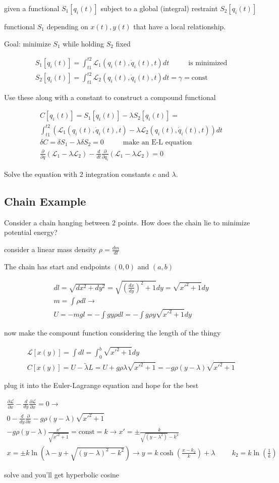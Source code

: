 \documentclass[fleqn]{report}
\newcommand{\hp}{\hspace{1cm}}
\newcommand{\const}{\textrm{const}}
\newcommand{\del}{\partial}
\newcommand{\equations} [1] {
\begin{gather*}
#1
\end{gather*}
}
\begin{document}
given a functional $S_1[q_i(t)]$ subject to a global (integral) restraint 
$S_2[q_i(t)]$

functional $S_1$ depending on $x(t), y(t)$ that have a local relationship. 

Goal: minimize $S_1$ while holding $S_2$ fixed 

\equations{
    S_1[q_i(t)] = 
    \int^{t2}_{t1} \mathcal L_1(q_i(t), \dot q_i(t), t) dt 
    \hp \textrm{ is minimized}
    \\
    S_2[q_i(t)] = 
    \int^{t2}_{t1} \mathcal L_2(q_i(t), \dot q_i(t), t) dt 
    =
    \gamma = \const 
}
Use these along with a constant to construct a compound functional 
\equations{
    C[q_i(t)] = S_1[q_i(t)] - \lambda S_2[q_i(t)]
    =
    \\
    \int^{t2}_{t1} (\mathcal L_1(q_i(t), \dot q_i(t), t) - 
    \lambda \mathcal L_2(q_i(t), \dot q_i(t), t)) dt 
    \\
    \delta C = \delta S_1 - \lambda \delta S_2 = 0
    \hp 
    \textrm{ make an E-L equation}
    \\
    \frac{\del}{\del q} (\mathcal L_1 - \lambda \mathcal L_2)
    -
    \frac{d}{dt} \frac{\del}{\del \dot q_i} 
    (\mathcal L_1 - \lambda \mathcal L_2)
    = 0
}
Solve the equation with $2$ integration constants $c$ and $\lambda$.

\subsection{Chain Example}
Consider a chain hanging between 2 points. How does the chain lie to 
minimize potential energy?

consider a linear mass density $\rho = \frac{dm}{dl}$

The chain has start and endpoints $(0, 0)$ and $(a, b)$

\equations{
    dl = \sqrt{dx^2 + dy^2} = \sqrt{(\frac{dx}{dy})^2 + 1} dy
    = \sqrt{x'^2 + 1} dy
    \\
    m = \int \rho dl 
    \rightarrow 
    \\
    U = -mgl = - \int g y \rho dl = - \int g \rho y \sqrt{x'^2 + 1} dy 
}
now make the compount function considering the length of the thingy 
\equations{
    \mathcal L[x(y)] = \int dl = \int^b_0 \sqrt{x'^2 + 1} dy 
    \\
    C[x(y)] = U - \tilde \lambda L = 
    U + g \rho \lambda \sqrt{x'^2 + 1} = 
    - g \rho (y - \lambda) \sqrt{x'^2 + 1}
}
plug it into the Euler-Lagrange equation and hope for the best 
\equations{
    \frac{\del \mathcal L}{\del x} - 
    \frac{d}{dy} \frac{\del \mathcal L}{\del \dot x}
    = 0
    \rightarrow 
    \\
    0 - 
    \frac{d}{dy} \frac{\del}{\del \dot x}
    - g \rho (y - \lambda) \sqrt{x'^2 + 1}
    \\
    - g \rho (y - \lambda) \frac{x'}{\sqrt{x'^2 + 1}}
    =
    \const = k
    \rightarrow 
    x' = \pm \frac{k}{\sqrt{(y - \lambda^2)} - k^2}
    \\
    x = \pm k \ln(\lambda - y + \sqrt{(y - \lambda)^2 - k^2})
    \rightarrow 
    y = k \cosh(\frac{x - k_2}{k}) + \lambda 
    \hp 
    k_2 = k \ln(\frac{1}{k})
}
solve and you'll get hyperbolic cosine 
\end{document}
